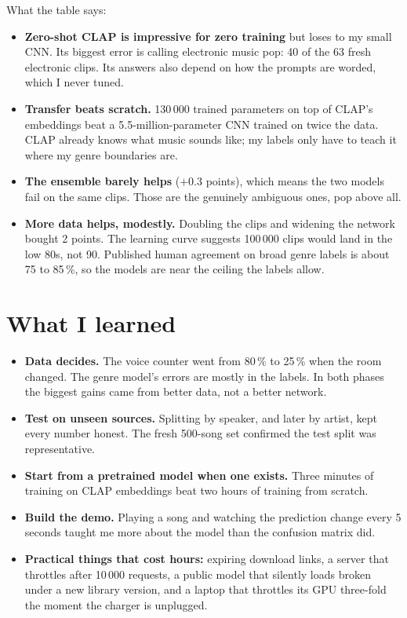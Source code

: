 \documentclass[11pt]{article}
\begin{document}
What the table says:
\begin{itemize}
  \item \textbf{Zero-shot CLAP is impressive for zero training} but loses to my small CNN. Its biggest error is calling electronic music pop: 40 of the 63 fresh electronic clips. Its answers also depend on how the prompts are worded, which I never tuned.
  \item \textbf{Transfer beats scratch.} 130\,000 trained parameters on top of CLAP's embeddings beat a 5.5-million-parameter CNN trained on twice the data. CLAP already knows what music sounds like; my labels only have to teach it where my genre boundaries are.
  \item \textbf{The ensemble barely helps} ($+0.3$ points), which means the two models fail on the same clips. Those are the genuinely ambiguous ones, pop above all.
  \item \textbf{More data helps, modestly.} Doubling the clips and widening the network bought 2 points. The learning curve suggests 100\,000 clips would land in the low 80s, not 90. Published human agreement on broad genre labels is about 75 to 85\,\%, so the models are near the ceiling the labels allow.
\end{itemize}

\section{What I learned}
\begin{itemize}
  \item \textbf{Data decides.} The voice counter went from 80\,\% to 25\,\% when the room changed. The genre model's errors are mostly in the labels. In both phases the biggest gains came from better data, not a better network.
  \item \textbf{Test on unseen sources.} Splitting by speaker, and later by artist, kept every number honest. The fresh 500-song set confirmed the test split was representative.
  \item \textbf{Start from a pretrained model when one exists.} Three minutes of training on CLAP embeddings beat two hours of training from scratch.
  \item \textbf{Build the demo.} Playing a song and watching the prediction change every 5 seconds taught me more about the model than the confusion matrix did.
  \item \textbf{Practical things that cost hours:} expiring download links, a server that throttles after 10\,000 requests, a public model that silently loads broken under a new library version, and a laptop that throttles its GPU three-fold the moment the charger is unplugged.
\end{itemize}
\end{document}
